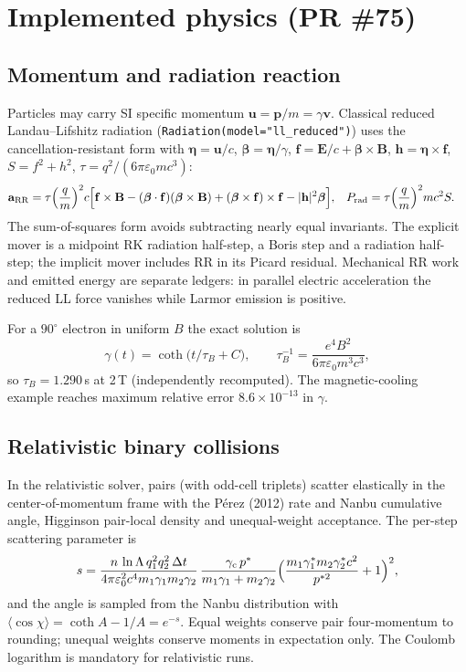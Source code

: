\documentclass[10pt,a4paper]{article}
\begin{document}
\section{Implemented physics (PR \#75)}
\subsection{Momentum and radiation reaction}
Particles may carry SI specific momentum $\mathbf u=\mathbf p/m=\gamma\mathbf v$. Classical reduced
Landau--Lifshitz radiation (\texttt{Radiation(model="ll\_reduced")}) uses the cancellation-resistant form
with $\boldsymbol\eta=\mathbf u/c$, $\boldsymbol\beta=\boldsymbol\eta/\gamma$,
$\mathbf f=\mathbf E/c+\boldsymbol\beta\times\mathbf B$, $\mathbf h=\boldsymbol\eta\times\mathbf f$,
$S=f^2+h^2$, $\tau=q^2/(6\pi\varepsilon_0 mc^3)$:
\begin{align}
\mathbf a_{\rm RR}&=\tau\Big(\frac qm\Big)^2 c\Big[\mathbf f\times\mathbf B-(\boldsymbol\beta\cdot\mathbf f)(\boldsymbol\beta\times\mathbf B)+(\boldsymbol\beta\times\mathbf f)\times\mathbf f-|\mathbf h|^2\boldsymbol\beta\Big],&
P_{\rm rad}&=\tau\Big(\frac qm\Big)^2mc^2S .
\end{align}
The sum-of-squares form avoids subtracting nearly equal invariants. The explicit mover is a midpoint RK
radiation half-step, a Boris step and a radiation half-step; the implicit mover includes RR in its Picard
residual. Mechanical RR work and emitted energy are separate ledgers: in parallel electric acceleration the
reduced LL force vanishes while Larmor emission is positive.

For a $90^\circ$ electron in uniform $B$ the exact solution is
\begin{equation}
\gamma(t)=\coth\!\big(t/\tau_B+C\big),\qquad \tau_B^{-1}=\frac{e^4B^2}{6\pi\varepsilon_0m^3c^3},
\end{equation}
so $\tau_B=1.290$\,s at 2\,T (independently recomputed). The magnetic-cooling example reaches maximum
relative error $8.6\times10^{-13}$ in $\gamma$.

\subsection{Relativistic binary collisions}
In the relativistic solver, pairs (with odd-cell triplets) scatter elastically in the center-of-momentum
frame with the Pérez (2012) rate and Nanbu cumulative angle, Higginson pair-local density and unequal-weight
acceptance. The per-step scattering parameter is
\begin{equation}
s=\frac{n\,\ln\Lambda\,q_1^2q_2^2\,\Delta t}{4\pi\varepsilon_0^2c^4m_1\gamma_1m_2\gamma_2}\,
\frac{\gamma_{\rm c}\,p^*}{m_1\gamma_1+m_2\gamma_2}\Big(\frac{m_1\gamma_1^*m_2\gamma_2^*c^2}{p^{*2}}+1\Big)^2,
\end{equation}
and the angle is sampled from the Nanbu distribution with $\langle\cos\chi\rangle=\coth A-1/A=e^{-s}$.
Equal weights conserve pair four-momentum to rounding; unequal weights conserve moments in expectation only.
The Coulomb logarithm is mandatory for relativistic runs.
\end{document}
